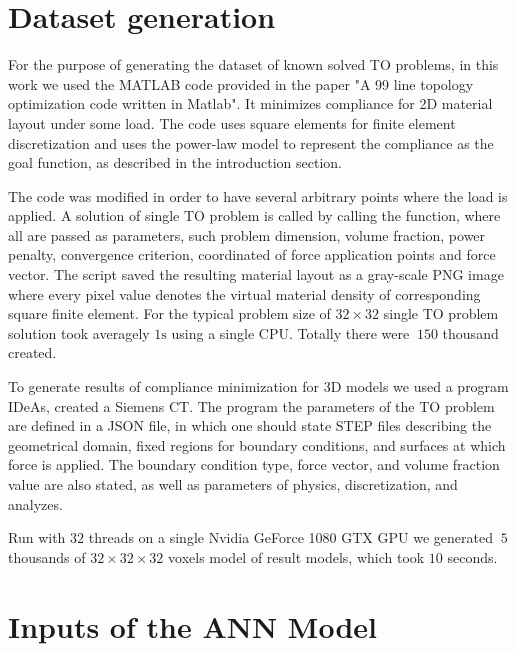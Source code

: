 \section{Dataset generation}

For the purpose of generating the dataset of known solved TO problems, in this work we used the MATLAB code provided in the paper "A 99 line topology optimization code written in Matlab"\cite{to_99line}.
It minimizes compliance for 2D material layout under some load.
The code uses square elements for finite element discretization and uses the power-law model to represent the compliance as the goal function, as described in the introduction section.
\medskip

The code was modified in order to have several arbitrary points where the load is applied.
A solution of single TO problem is called by calling the function, where all are passed as parameters, such problem dimension, volume fraction, power penalty, convergence criterion, coordinated of force application points and force vector. 
The script saved the resulting material layout as a gray-scale PNG image where every pixel value denotes the virtual material density of corresponding square finite element.
For the typical problem size of $ 32 \times 32 $ single TO problem solution took averagely $1 \mathrm{s}$ using a single CPU.
Totally there were $~150$ thousand created.
\medskip

To generate results of compliance minimization for 3D models we used a program IDeAs\cite{}, created a Siemens CT.
The program the parameters of the TO problem are defined in a JSON\cite{bibl:json} file, in which one should state STEP\cite{bibl:step} files describing the geometrical domain, fixed regions for boundary conditions, and surfaces at which force is applied.
The boundary condition type, force vector, and volume fraction value are also stated, as well as parameters of physics, discretization, and analyzes. 
\medskip

Run with $32$ threads on a single Nvidia GeForce 1080 GTX GPU we generated $~5$ thousands of $ 32 \times 32 \times 32$ voxels model of result models, which took $10$ seconds.
\medskip 



\section{Inputs of the ANN Model}

